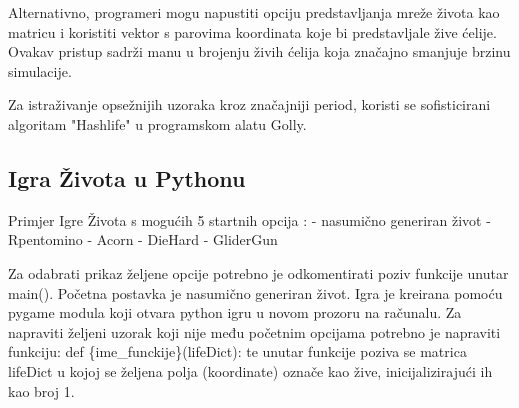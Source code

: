 \documentclass[11pt]{article}
\begin{document}
Alternativno, programeri mogu napustiti opciju predstavljanja mreže
života kao matricu i koristiti vektor s parovima koordinata koje bi
predstavljale žive ćelije. Ovakav pristup sadrži manu u brojenju živih
ćelija koja značajno smanjuje brzinu simulacije.

Za istraživanje opsežnijih uzoraka kroz značajniji period, koristi se
sofisticirani algoritam "Hashlife" u programskom alatu Golly.

    \subsection{Igra Života u Pythonu}\label{igra-ux17eivota-u-pythonu}

Primjer Igre Života s mogućih 5 startnih opcija : - nasumično generiran
život - Rpentomino - Acorn - DieHard - GliderGun

Za odabrati prikaz željene opcije potrebno je odkomentirati poziv
funkcije unutar main(). Početna postavka je nasumično generiran život.
Igra je kreirana pomoću pygame modula koji otvara python igru u novom
prozoru na računalu. Za napraviti željeni uzorak koji nije među početnim
opcijama potrebno je napraviti funkciju: def
\{ime\_funckije\}(lifeDict): te unutar funkcije poziva se matrica
lifeDict u kojoj se željena polja (koordinate) označe kao žive,
inicijalizirajući ih kao broj 1.
\end{document}
